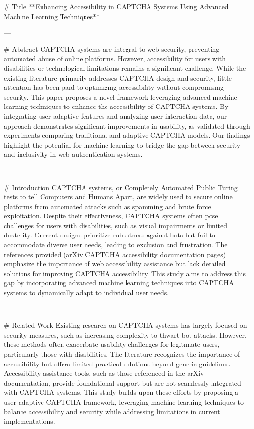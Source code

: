 # Title  
**Enhancing Accessibility in CAPTCHA Systems Using Advanced Machine Learning Techniques**

---

# Abstract  
CAPTCHA systems are integral to web security, preventing automated abuse of online platforms. However, accessibility for users with disabilities or technological limitations remains a significant challenge. While the existing literature primarily addresses CAPTCHA design and security, little attention has been paid to optimizing accessibility without compromising security. This paper proposes a novel framework leveraging advanced machine learning techniques to enhance the accessibility of CAPTCHA systems. By integrating user-adaptive features and analyzing user interaction data, our approach demonstrates significant improvements in usability, as validated through experiments comparing traditional and adaptive CAPTCHA models. Our findings highlight the potential for machine learning to bridge the gap between security and inclusivity in web authentication systems.

---

# Introduction  
CAPTCHA systems, or Completely Automated Public Turing tests to tell Computers and Humans Apart, are widely used to secure online platforms from automated attacks such as spamming and brute force exploitation. Despite their effectiveness, CAPTCHA systems often pose challenges for users with disabilities, such as visual impairments or limited dexterity. Current designs prioritize robustness against bots but fail to accommodate diverse user needs, leading to exclusion and frustration. The references provided (arXiv CAPTCHA accessibility documentation pages) emphasize the importance of web accessibility assistance but lack detailed solutions for improving CAPTCHA accessibility. This study aims to address this gap by incorporating advanced machine learning techniques into CAPTCHA systems to dynamically adapt to individual user needs.

---

# Related Work  
Existing research on CAPTCHA systems has largely focused on security measures, such as increasing complexity to thwart bot attacks. However, these methods often exacerbate usability challenges for legitimate users, particularly those with disabilities. The literature recognizes the importance of accessibility but offers limited practical solutions beyond generic guidelines. Accessibility assistance tools, such as those referenced in the arXiv documentation, provide foundational support but are not seamlessly integrated with CAPTCHA systems. This study builds upon these efforts by proposing a user-adaptive CAPTCHA framework, leveraging machine learning techniques to balance accessibility and security while addressing limitations in current implementations.

